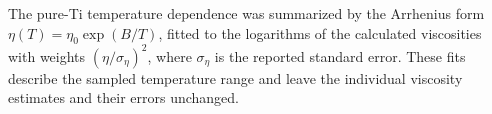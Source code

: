 The pure-Ti temperature dependence was summarized by the Arrhenius form $\eta(T)=\eta_0\exp(B/T)$, fitted to the logarithms of the calculated viscosities with weights $(\eta/\sigma_\eta)^2$, where $\sigma_\eta$ is the reported standard error.
These fits describe the sampled temperature range and leave the individual viscosity estimates and their errors unchanged.
